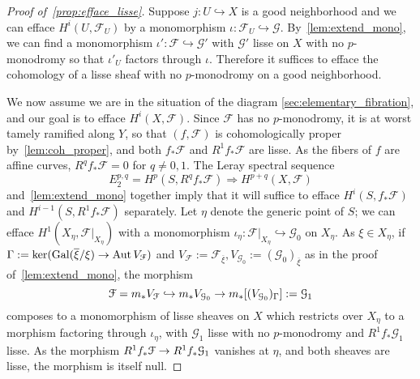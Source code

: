 \documentclass[deligne.tex]{subfiles}
\begin{document}
\begin{proof}[Proof of~\eqref{prop:efface_lisse}]
Suppose $j:U\hookrightarrow X$ is a good neighborhood and we can efface
$H^i(U,\mathcal F_U)$ by a monomorphism
$\iota:\mathcal F_U\hookrightarrow\mathcal G$.
By~\eqref{lem:extend_mono}, we can find a monomorphism
$\iota':\mathcal F\hookrightarrow\mathcal G'$ with $\mathcal G'$ 
lisse on $X$ with no $p$-monodromy so that $\iota'_U$ factors 
through $\iota$.
Therefore it suffices to efface the cohomology of a lisse sheaf with
no $p$-monodromy on a good neighborhood.

We now assume we are in the situation of the diagram 
\eqref{sec:elementary_fibration}, and our goal is to efface
$H^i(X,\mathcal F)$. Since $\mathcal F$ has no $p$-monodromy, it is at worst
tamely ramified along $Y$, so that $(f,\mathcal F)$ is cohomologically 
proper by~\eqref{lem:coh_proper}, and both $f_*\mathcal F$ and
$R^1f_*\mathcal F$ are lisse. As the fibers of $f$ are affine curves,
$R^qf_*\mathcal F=0$ for $q\ne0,1$. The Leray spectral sequence
\begin{equation*}
	E^{p,q}_2=H^p(S,R^qf_*\mathcal F)\Rightarrow H^{p+q}(X,\mathcal F)
\end{equation*}
and~\eqref{lem:extend_mono} together imply that it will suffice to efface 
$H^i(S,f_*\mathcal F)$ and $H^{i-1}(S,R^1f_*\mathcal F)$ separately.
Let $\eta$ denote the generic point of $S$; we can efface
$H^1(X_\eta,\mathcal F|_{X_\eta})$ with a monomorphism
$\iota_\eta:\mathcal F|_{X_\eta}\hookrightarrow\mathcal G_0$ on $X_\eta$.
As $\xi\in X_\eta$, if
$\Gamma:=\ker(\operatorname{Gal}(\overline\xi/\xi)\rightarrow\operatorname{Aut} V_{\mathcal F})$
and $V_{\mathcal F}:=\mathcal F_{\overline\xi},V_{\mathcal G_0}:=(\mathcal G_0)_{\overline\xi}$
as in the proof of~\eqref{lem:extend_mono}, the morphism
\begin{equation*}
	\mathcal F=m_*V_{\mathcal F}\hookrightarrow
	m_*V_{\mathcal G_0}\rightarrow
	m_*[(V_{\mathcal G_0})_\Gamma]:=\mathcal G_1
\end{equation*}
composes to a monomorphism of lisse sheaves on $X$
which restricts over $X_\eta$ to a morphism factoring through $\iota_\eta$,
with $\mathcal G_1$ lisse with no $p$-monodromy and $R^1f_*\mathcal G_1$ 
lisse. As the morphism $R^1f_*\mathcal F\rightarrow R^1f_*\mathcal G_1$ vanishes
at $\eta$, and both sheaves are lisse, the morphism is itself null.


\end{proof}
\end{document}
